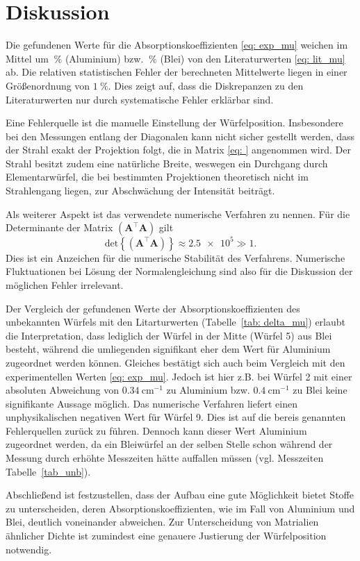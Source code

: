 \section{Diskussion}
Die gefundenen Werte für die Absorptionskoeffizienten \eqref{eq: exp_mu} weichen im Mittel
um $\SI{}{\percent}$ (Aluminium) bzw. $\SI{}{\percent}$ (Blei) von den Literaturwerten \eqref{eq: lit_mu} ab.
Die relativen statistischen Fehler der berechneten Mittelwerte liegen in einer Größenordnung von
$\SI{1}{\percent}$. Dies zeigt auf, dass die Diskrepanzen zu den Literaturwerten nur durch
systematische Fehler erklärbar sind.

Eine Fehlerquelle ist die manuelle Einstellung der Würfelposition. Insbesondere bei den Messungen
entlang der Diagonalen kann nicht sicher gestellt werden, dass der Strahl exakt der Projektion folgt,
die in Matrix \eqref{eq: } angenommen wird. Der Strahl besitzt zudem eine natürliche Breite, weswegen
ein Durchgang durch Elementarwürfel, die bei bestimmten Projektionen theoretisch nicht im Strahlengang liegen, zur
Abschwächung der Intensität beiträgt.

Als weiterer Aspekt ist das verwendete numerische Verfahren zu nennen. Für die Determinante der Matrix
$\left(\symbf{A}^\top \symbf{A}\right)$ gilt
\begin{equation}
  \mathup{det}\left\{\left(\symbf{A}^\top \symbf{A}\right)\right\} \approx \num{2.5e5} \gg 1.
\end{equation}
Dies ist ein Anzeichen für die numerische Stabilität des Verfahrens. Numerische Fluktuationen bei
Lösung der Normalengleichung sind also für die Diskussion der möglichen Fehler irrelevant.

Der Vergleich der gefundenen Werte der Absorptionskoeffizienten des unbekannten Würfels mit den
Litarturwerten (Tabelle~\ref{tab: delta_mu}) erlaubt die Interpretation, dass lediglich der
Würfel in der Mitte (Würfel 5) aus Blei besteht, während die umliegenden signifikant eher dem Wert
für Aluminium zugeordnet werden können. Gleiches bestätigt sich auch beim Vergleich mit den experimentellen
Werten \eqref{eq: exp_mu}. Jedoch ist hier z.B. bei Würfel 2 mit einer absoluten Abweichung von $\SI{0.34}{\centi\meter^{-1}}$ zu Aluminium
bzw. $\SI{0.4}{\centi\meter^{-1}}$ zu Blei keine signifikante Aussage möglich. Das numerische Verfahren liefert einen unphysikalischen
negativen Wert für Würfel 9. Dies ist auf die bereis genannten Fehlerquellen zurück zu führen.
Dennoch kann dieser Wert Aluminium zugeordnet werden, da ein Bleiwürfel an der selben Stelle schon während
der Messung durch erhöhte Messzeiten hätte auffallen müssen (vgl. Messzeiten Tabelle~\ref{tab_unb}).

Abschließend ist festzustellen, dass der Aufbau eine gute Möglichkeit bietet Stoffe zu unterscheiden, deren
Absorptionskoeffizienten, wie im Fall von Aluminium und Blei, deutlich voneinander abweichen. Zur Unterscheidung
von Matrialien ähnlicher Dichte ist zumindest eine genauere Justierung der Würfelposition notwendig.
